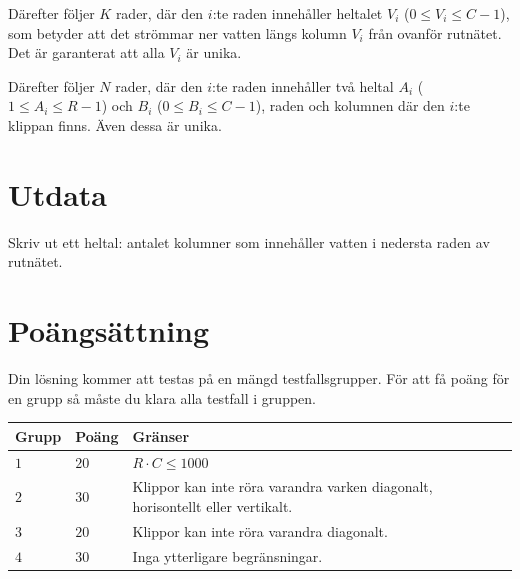 Därefter följer $K$ rader, där den $i$:te raden innehåller heltalet $V_i$ ($0 \le V_i \le C-1$), som betyder att det strömmar ner vatten längs kolumn $V_i$ från ovanför rutnätet.
Det är garanterat att alla $V_i$ är unika.

Därefter följer $N$ rader, där den $i$:te raden innehåller två heltal $A_i$ ($1 \le A_i \le R-1$) och $B_i$ ($0 \le B_i \le C-1$), raden och kolumnen där den $i$:te klippan finns.
Även dessa är unika.

\section*{Utdata}
Skriv ut ett heltal: antalet kolumner som innehåller vatten i nedersta raden av rutnätet.

\section*{Poängsättning}
Din lösning kommer att testas på en mängd testfallsgrupper.
För att få poäng för en grupp så måste du klara alla testfall i gruppen.

\noindent
\begin{tabular}{| l | l | p{12cm} |}
  \hline
  \textbf{Grupp} & \textbf{Poäng} & \textbf{Gränser} \\ \hline
  $1$    & $20$      & $R \cdot C \le 1000$ \\ \hline
  $2$    & $30$      & Klippor kan inte röra varandra varken diagonalt, horisontellt eller vertikalt. \\ \hline
  $3$    & $20$      & Klippor kan inte röra varandra diagonalt. \\ \hline
  $4$    & $30$      & Inga ytterligare begränsningar. \\ \hline
\end{tabular}
